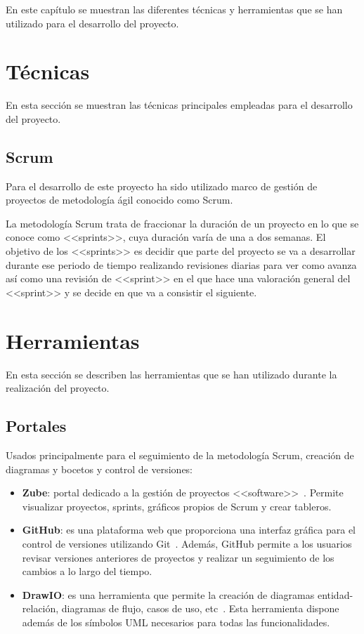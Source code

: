 
En este capítulo se muestran las diferentes técnicas y herramientas que se han utilizado para el desarrollo del proyecto.


\section{Técnicas}

En esta sección se muestran las técnicas principales empleadas para el desarrollo del proyecto.

\subsection{Scrum}

Para el desarrollo de este proyecto ha sido utilizado marco de gestión de proyectos de metodología ágil conocido como Scrum.

La metodología Scrum trata de fraccionar la duración de un proyecto en lo que se conoce como <<sprints>>, cuya duración varía de una a dos semanas.
El objetivo de los <<sprints>> es decidir que parte del proyecto se va a desarrollar durante ese periodo de tiempo realizando revisiones diarias para ver como avanza así como una revisión de <<sprint>> en el que hace una valoración general del <<sprint>> y se decide en que va a consistir el siguiente.

\section{Herramientas}
\label{chap:Tyh}
En esta sección se describen las herramientas que se han utilizado durante la realización del proyecto.

\subsection{Portales}

Usados principalmente para el seguimiento de la metodología Scrum, creación de diagramas y bocetos y control de versiones:
\begin{itemize}
\item \textbf{Zube}: portal dedicado a la gestión de proyectos <<software>>~\cite{zubeHome}. Permite visualizar proyectos, sprints,
gráficos propios de Scrum y crear tableros.
\item \textbf{GitHub}: es una plataforma web que proporciona una interfaz gráfica para el control de versiones utilizando Git~\cite{githubHome}. Además, GitHub permite a los usuarios revisar versiones anteriores de proyectos y realizar un seguimiento de los cambios a lo largo del tiempo.
\item \textbf{DrawIO}: es una herramienta que permite la creación de diagramas entidad-relación, diagramas de flujo, casos de uso, etc~\cite{drawioHome}. Esta herramienta dispone además de los símbolos UML necesarios para todas las funcionalidades.
\end{itemize}

